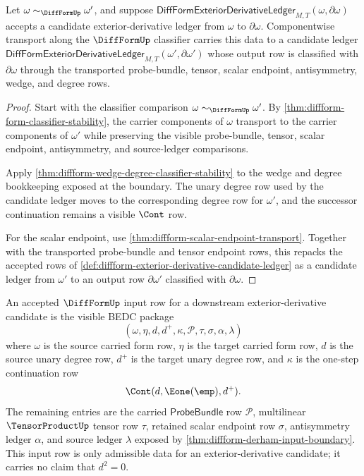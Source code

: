 \begin{theorem}
\label{thm:diffform-exterior-derivative-wedge-input-stability}
Let $\omega\sim_{\DiffFormUp}\omega'$, and suppose
$\mathsf{DiffFormExteriorDerivativeLedger}_{M,T}(\omega,\partial\omega)$
accepts a candidate exterior-derivative ledger from $\omega$ to
$\partial\omega$. Componentwise transport along the $\DiffFormUp$ classifier
carries this data to a candidate ledger
$\mathsf{DiffFormExteriorDerivativeLedger}_{M,T}(\omega',\partial\omega')$
whose output row is classified with $\partial\omega$ through the transported
probe-bundle, tensor, scalar endpoint, antisymmetry, wedge, and degree rows.
\end{theorem}
\begin{proof}
Start with the classifier comparison
$\omega\sim_{\DiffFormUp}\omega'$. By
\autoref{thm:diffform-form-classifier-stability}, the carrier components of
$\omega$ transport to the carrier components of $\omega'$ while preserving the
visible probe-bundle, tensor, scalar endpoint, antisymmetry, and source-ledger
comparisons.

Apply \autoref{thm:diffform-wedge-degree-classifier-stability} to the wedge and
degree bookkeeping exposed at the boundary. The unary degree row used by the
candidate ledger moves to the corresponding degree row for $\omega'$, and the
successor continuation remains a visible $\Cont$ row.

For the scalar endpoint, use
\autoref{thm:diffform-scalar-endpoint-transport}. Together with the transported
probe-bundle and tensor endpoint rows, this repacks the accepted rows of
\autoref{def:diffform-exterior-derivative-candidate-ledger} as a candidate
ledger from $\omega'$ to an output row $\partial\omega'$ classified with
$\partial\omega$.
\end{proof}

\begin{definition}
\label{def:diffform-exterior-derivative-input-row}
An accepted $\DiffFormUp$ input row for a downstream exterior-derivative
candidate is the visible BEDC package
$$
(\omega,\eta,d,d^+,\kappa,\mathcal{P},\tau,\sigma,\alpha,\lambda)
$$
where $\omega$ is the source carried form row, $\eta$ is the target carried form
row, $d$ is the source unary degree row, $d^+$ is the target unary degree row,
and $\kappa$ is the one-step continuation row
$$
\Cont(d,\Eone(\emp),d^+).
$$
The remaining entries are the carried $\mathsf{ProbeBundle}$ row
$\mathcal{P}$, multilinear $\TensorProductUp$ tensor row $\tau$, retained
scalar endpoint row $\sigma$, antisymmetry ledger $\alpha$, and source ledger
$\lambda$ exposed by \autoref{thm:diffform-derham-input-boundary}. This input
row is only admissible data for an exterior-derivative candidate; it carries no
claim that $d^2=0$.
\end{definition}

